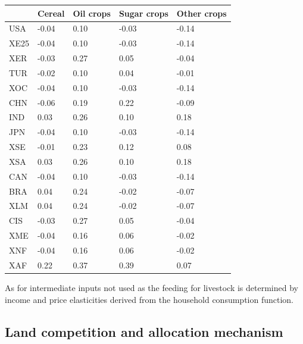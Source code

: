 \documentclass[10pt,a4paper,titlepage,dvipdfmx]{book}
\begin{document}
\begin{itemize}
\begin{tabularx}{\textwidth}{|
p{}|
p{}|
p{}|
p{}|
p{}|} 
\caption{\label{tab:IncElaCro}Income elasticity of crop consumption}\\
\hline 
 & Cereal & Oil crops & Sugar crops & Other crops \\\hline 
USA & -0.04 & 0.10 & -0.03 & -0.14 \\\hline 
XE25 & -0.04 & 0.10 & -0.03 & -0.14 \\\hline 
XER & -0.03 & 0.27 & 0.05 & -0.04 \\\hline 
TUR & -0.02 & 0.10 & 0.04 & -0.01 \\\hline 
XOC & -0.04 & 0.10 & -0.03 & -0.14 \\\hline 
CHN & -0.06 & 0.19 & 0.22 & -0.09 \\\hline 
IND & 0.03 & 0.26 & 0.10 & 0.18 \\\hline 
JPN & -0.04 & 0.10 & -0.03 & -0.14 \\\hline 
XSE & -0.01 & 0.23 & 0.12 & 0.08 \\\hline 
XSA & 0.03 & 0.26 & 0.10 & 0.18 \\\hline 
CAN & -0.04 & 0.10 & -0.03 & -0.14 \\\hline 
BRA & 0.04 & 0.24 & -0.02 & -0.07 \\\hline 
XLM & 0.04 & 0.24 & -0.02 & -0.07 \\\hline 
CIS & -0.03 & 0.27 & 0.05 & -0.04 \\\hline 
XME & -0.04 & 0.16 & 0.06 & -0.02 \\\hline 
XNF & -0.04 & 0.16 & 0.06 & -0.02 \\\hline 
XAF & 0.22 & 0.37 & 0.39 & 0.07 \\\hline 
\end{tabularx}

As for intermediate inputs not used as the feeding for livestock is determined by income and price elasticities derived from the household consumption function.

\subsection{\label{subsec:LanComAlloMec}{Land competition and allocation mechanism}}


\end{itemize}
\end{document}
